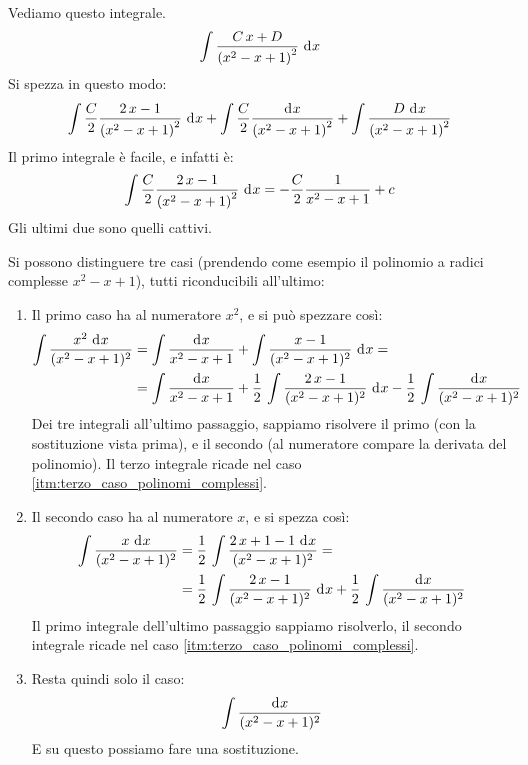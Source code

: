 \begin{exmp}
Vediamo questo integrale.
\[
\int \frac{C \, x + D}{\left( x^2 - x + 1 \right)^2} \dx
\]
Si spezza in questo modo:
\[
\int \frac{C}{2} \frac{2 \, x - 1}{\left( x^2 - x + 1 \right)^2} \dx +
\int \frac{C}{2} \frac{\diff x}{\left( x^2 - x + 1 \right)^2} +
\int \frac{D \dx}{\left( x^2 - x + 1 \right)^2}
\]
Il primo integrale \`e facile, e infatti \`e:
\[
\int \frac{C}{2} \frac{2 \, x - 1}{\left( x^2 - x + 1 \right)^2} \dx =
- \frac{C}{2} \frac{1}{x^2 - x + 1} + c
\]
Gli ultimi due sono quelli cattivi.
\end{exmp}

Si possono distinguere tre casi (prendendo come esempio il polinomio a radici complesse $x^2 - x + 1$), tutti riconducibili all'ultimo:
\begin{enumerate}
    \item Il primo caso ha al numeratore $x^2$, e si pu\`o spezzare cos\`i:
    \begin{align*}
    \int \frac{x^2 \dx}{(x^2 - x + 1)^2} &= 
    \int \frac{\diff x}{x^2 - x + 1} + \int \frac{x - 1}{(x^2 - x + 1)^2} \dx = \\
    &= \int \frac{\diff x}{x^2 - x + 1} + \frac{1}{2} \, \int \frac{2 \, x - 1}{(x^2 - x + 1)^2} \dx - \frac{1}{2} \, \int \frac{\diff x}{(x^2 - x + 1)^2}
    \end{align*}
    Dei tre integrali all'ultimo passaggio, sappiamo risolvere il primo (con la sostituzione vista prima), e il secondo (al numeratore compare la derivata del polinomio). Il terzo integrale ricade nel caso \ref{itm:terzo_caso_polinomi_complessi}.
    \item Il secondo caso ha al numeratore $x$, e si spezza cos\`i:
    \begin{align*}
    \int \frac{x \dx}{(x^2 - x + 1)^2} &= \frac{1}{2} \, \int \frac{2 \, x + 1 - 1 \dx}{(x^2 - x + 1)^2} = \\
    &= \frac{1}{2} \, \int \frac{2 \, x - 1}{(x^2 - x + 1)^2} \dx + \frac{1}{2} \, \int \frac{\diff x}{(x^2 - x + 1)^2} \\
    \end{align*}
    Il primo integrale dell'ultimo passaggio sappiamo risolverlo, il secondo integrale ricade nel caso \ref{itm:terzo_caso_polinomi_complessi}.
    \item\label{itm:terzo_caso_polinomi_complessi} Resta quindi solo il caso:
    \[
    \int \frac{\diff x}{(x^2 - x + 1)^2} 
    \]
    E su questo possiamo fare una sostituzione.
\end{enumerate}

